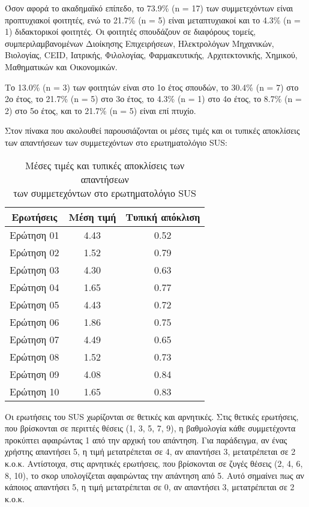         Όσον αφορά το ακαδημαϊκό επίπεδο, το 73.9\% (n = 17) των συμμετεχόντων είναι προπτυχιακοί φοιτητές, ενώ το 21.7\% (n = 5) είναι μεταπτυχιακοί και το 4.3\% (n = 1) διδακτορικοί φοιτητές. Οι φοιτητές σπουδάζουν σε διαφόρους τομείς, συμπεριλαμβανομένων Διοίκησης Επιχειρήσεων, Ηλεκτρολόγων Μηχανικών, Βιολογίας, CEID, Ιατρικής, Φιλολογίας, Φαρμακευτικής, Αρχιτεκτονικής, Χημικού, Μαθηματικών και Οικονομικών.

        Το 13.0\% (n = 3) των φοιτητών είναι στο 1ο έτος σπουδών, το 30.4\% (n = 7) στο 2ο έτος, το 21.7\% (n = 5) στο 3ο έτος, το 4.3\% (n = 1) στο 4ο έτος, το 8.7\% (n = 2) στο 5ο έτος, και το 21.7\% (n = 5) είναι επί πτυχίο.

        Στον πίνακα που ακολουθεί παρουσιάζονται οι μέσες τιμές και οι τυπικές αποκλίσεις των απαντήσεων των συμμετεχόντων στο ερωτηματολόγιο SUS:
        \begin{table}[H] \noindent\centering \small
            \caption{\centering Μέσες τιμές και τυπικές αποκλίσεις των απαντήσεων \\ των συμμετεχόντων στο ερωτηματολόγιο SUS}
            \begin{tabular}{c|c|c}
               \textbf{Ερωτήσεις} & \textbf{Μέση τιμή} & \textbf{Τυπική απόκλιση} \\
                \midrule
                Ερώτηση 01 & 4.43 & 0.52 \\
                Ερώτηση 02 & 1.52 & 0.79 \\
                Ερώτηση 03 & 4.30 & 0.63 \\
                Ερώτηση 04 & 1.65 & 0.77 \\
                Ερώτηση 05 & 4.43 & 0.72 \\
                Ερώτηση 06 & 1.86 & 0.75 \\
                Ερώτηση 07 & 4.49 & 0.65 \\
                Ερώτηση 08 & 1.52 & 0.73 \\
                Ερώτηση 09 & 4.08 & 0.84 \\
                Ερώτηση 10 & 1.65 & 0.83 \\
            \end{tabular}
            \label{tab:sus-results}
        \end{table}

        Οι ερωτήσεις του SUS χωρίζονται σε θετικές και αρνητικές. Στις θετικές ερωτήσεις, που βρίσκονται σε περιττές θέσεις (1, 3, 5, 7, 9), η βαθμολογία κάθε συμμετέχοντα προκύπτει αφαιρώντας 1 από την αρχική του απάντηση. Για παράδειγμα, αν ένας χρήστης απαντήσει 5, η τιμή μετατρέπεται σε 4, αν απαντήσει 3, μετατρέπεται σε 2 κ.ο.κ. Αντίστοιχα, στις αρνητικές ερωτήσεις, που βρίσκονται σε ζυγές θέσεις (2, 4, 6, 8, 10), το σκορ υπολογίζεται αφαιρώντας την απάντηση από 5. Αυτό σημαίνει πως αν κάποιος απαντήσει 5, η τιμή μετατρέπεται σε 0, αν απαντήσει 3, μετατρέπεται σε 2 κ.ο.κ.

